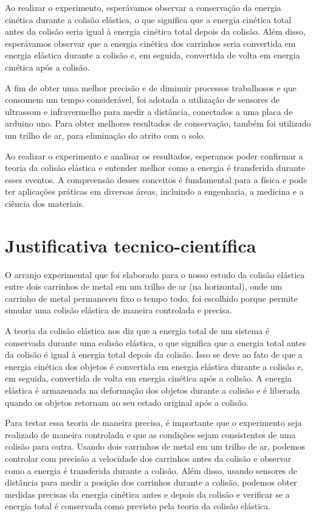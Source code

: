 \documentclass[a4paper,12pt]{article}
\begin{document}
\begin{multicols}{2}
Ao realizar o experimento, esperávamos observar a conservação da energia cinética durante a colisão elástica, o que significa que a energia cinética total antes da colisão seria igual à energia cinética total depois da colisão. Além disso, esperávamos observar que a energia cinética dos carrinhos seria convertida em energia elástica durante a colisão e, em seguida, convertida de volta em energia cinética após a colisão.

A fim de obter uma melhor precisão e de diminuir processos trabalhosos e que consomem um tempo considerável, foi adotada a utilização de sensores de ultrassom e infravermelho para medir a distância, conectados a uma placa de arduino uno. Para obter melhores resultados de conservação, também foi utilizado um trilho de ar, para eliminação do atrito com o solo.

Ao realizar o experimento e analisar os resultados, esperamos poder confirmar a teoria da colisão elástica e entender melhor como a energia é transferida durante esses eventos. A compreensão desses conceitos é fundamental para a física e pode ter aplicações práticas em diversas áreas, incluindo a engenharia, a medicina e a ciência dos materiais.

\section{Justificativa tecnico-científica}

O arranjo experimental que foi elaborado para o nosso estudo da colisão elástica entre dois carrinhos de metal em um trilho de ar (na horizontal), onde um carrinho de metal permaneceu fixo o tempo todo, foi escolhido porque permite simular uma colisão elástica de maneira controlada e precisa.

A teoria da colisão elástica nos diz que a energia total de um sistema é conservada durante uma colisão elástica, o que significa que a energia total antes da colisão é igual à energia total depois da colisão. Isso se deve ao fato de que a energia cinética dos objetos é convertida em energia elástica durante a colisão e, em seguida, convertida de volta em energia cinética após a colisão. A energia elástica é armazenada na deformação dos objetos durante a colisão e é liberada quando os objetos retornam ao seu estado original após a colisão.

Para testar essa teoria de maneira precisa, é importante que o experimento seja realizado de maneira controlada e que as condições sejam consistentes de uma colisão para outra. Usando dois carrinhos de metal em um trilho de ar, podemos controlar com precisão a velocidade dos carrinhos antes da colisão e observar como a energia é transferida durante a colisão. Além disso, usando sensores de distância para medir a posição dos carrinhos durante a colisão, podemos obter medidas precisas da energia cinética antes e depois da colisão e verificar se a energia total é conservada como previsto pela teoria da colisão elástica.


\end{multicols}
\end{document}
